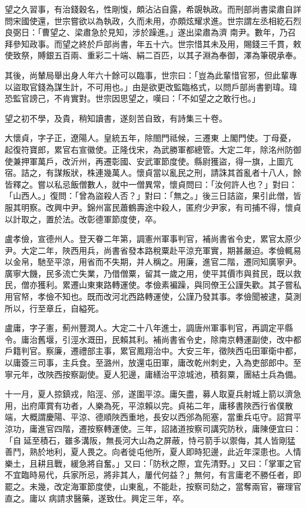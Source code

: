 \begin{pinyinscope}
 望之久習事，有治錢穀名，性剛愎，頗沾沾自露，希覬執政。而刑部尚書梁肅自詳問宋國使還，世宗嘗欲以為執政，久而未用，亦頗炫耀求進。世宗謂左丞相紇石烈良弼日：「曹望之、梁肅急於見知，涉於躁進。」遂出梁肅為濟
 南尹。數年，乃召拜參知政事。而望之終於戶部尚書，年五十六。世宗惜其未及用，賜錢三千貫，敕使致祭，賻銀五百兩、重彩二十端、絹二百匹，以其子淵為奉御，澤為筆硯承奉。



 其後，尚輦局舉出身人年六十餘可以臨事，世宗曰：「豈為此輩惜官邪，但此輩專以盜取官錢為謀生計，不可用也。」由是欲更改監臨格式，以問戶部尚書劉瑋。瑋恐監官謗己，不肯實對。世宗因思望之，嘆曰：「不如望之之敢行也。」



 望之初不學，及貴，稍知讀書，遂刻苦自致，有詩集三十卷。



 大懷貞，字子正，遼陽人。皇統五年，除閤門祗候，三遷東
 上閣門使。丁母憂，起復符寶郎，累官右宣徽使。正隆伐宋，為武勝軍都總管。大定二年，除洺州防御使兼押軍萬戶，改沂州，再遷彰國、安武軍節度使。縣尉獲盜，得一旗，上圖亢宿。詰之，有謀叛狀，株連幾萬人。懷貞當以亂民之刑，請誅其首亂者十八人，餘皆釋之。嘗以私忌飯僧數人，就中一僧異常，懷貞問曰：「汝何許人也？」對曰：「山西人。」復問：「曾為盜殺人否？」對曰：「無之。」後三日詰盜，果引此僧，皆服其明察。改興中尹。錦州富民蕭鶴壽途中殺人，匿府少尹家，有司捕不得，懷貞以計取之，置於法。改彰德軍節度使，卒。



 盧孝儉，宣德州人。登天眷二年第，調憲州軍事判官，補尚書省令史，累官太原少尹。大定二年，陜西用兵，尚書省發本路稅粟赴平涼充軍實，期甚嚴迫。孝儉輒易以金帛，馳至平涼，用省而不失期，并人稱之。用廉，進官二階，遷同知廣寧尹。廣寧大饑，民多流亡失業，乃借僧粟，留其一歲之用，使平其價市與貧民，既以救民，僧亦獲利。累遷山東東路轉運使。孝儉素褊躁，與同僚王公謹失歡。其子嘗私用官帑，孝儉不知也。既而改河北西路轉運使，公謹乃發其事。孝儉聞被逮，莫測所以，行至章丘，自縊死。



 盧庸，字子憲，薊州豐潤人。大定二十八年進士，調唐州軍事判官，再調定平縣令。庸治舊堰，引涇水溉田，民賴其利。補尚書省令史，除南京轉運副使，改中都戶籍判官。察廉，遷禮部主事，累官鳳翔治中。大安三年，徵陜西屯田軍衛中都，以庸簽三司事，主兵食。至潞州，放還屯田軍，庸改乾州刺史，入為吏部郎中。至寧元年，改陜西按察副使。夏人犯邊，庸繕治平涼城池，積芻粟，團結土兵為備。



 十一月，夏人掠鎮戎，陷涇、邠，遂圍平涼。庸矢盡，募人取夏兵射城上箭以濟急用，出府庫賞有功者，人樂為死，平涼賴以完。貞祐二年，庸移書陜西行省僕散
 端，大概謂慶陽、平涼、德順陜西重地，長安以西邠為阨塞，當重兵屯守。詔賞平涼功，庸進官四階，遷按察轉運使。三年，詔諸道按察司講究防秋，庸陳便宜曰：「自延至積石，雖多溝阪，無長河大山為之屏蔽，恃弓箭手以禦侮，其人皆剛猛善鬥，熟於地利，夏人畏之。向者徙屯他所，夏人即時犯邊，此近年深患也。人情樂土，且耕且戰，緩急將自奮。」又曰：「防秋之際，宜先清野。」又曰：「掌軍之官不宜臨時易代，兵家所忌，將非其人，屢代何益？」無何，有言庸老不勝任者，即罷之。未幾，改定海軍節度使，山東亂，不能赴，按察司劾之，當奪兩官，審理官直之。庸以
 病請求醫藥，遂致仕。興定三年，卒。




\end{pinyinscope}
